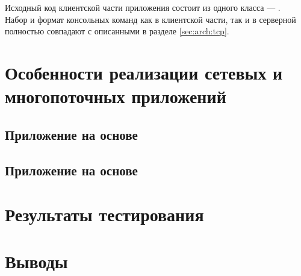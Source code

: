 Исходный код клиентской части  приложения состоит из одного класса --- .\\[3mm]

Набор и формат консольных команд как в клиентской части, так и в серверной полностью совпадают с описанными в разделе \ref{sec:arch:tcp}.

\section{Особенности реализации сетевых и многопоточных приложений}\label{sec:net}

\subsection{Приложение на основе }

\subsection{Приложение на основе }

\section{Результаты тестирования}

\section{Выводы}


